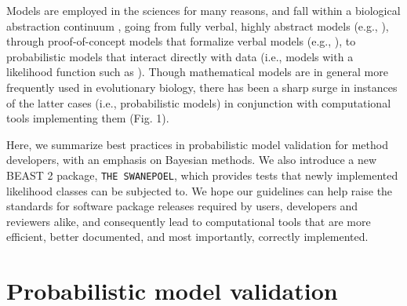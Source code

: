 \documentclass[oneside]{article}
\begin{document}
Models are employed in the sciences for many reasons, and fall within
a biological abstraction continuum \citep{servedio14}, going from
fully verbal, highly abstract models (e.g., \citealt{vanvalen73}), through proof-of-concept models
that formalize verbal models (e.g., \citealt{maynard78,reinhold99,mendes18}), to probabilistic models that interact
directly with data (i.e., models with a likelihood function such as \citealt{yule24,felsenstein73,hky,hudson90}).
Though mathematical models are in general more frequently used in
evolutionary biology, there has been a sharp surge in instances of the
latter cases (i.e., probabilistic models) in conjunction with computational tools implementing them
(Fig. 1).

\vspace{.5cm}


Here, we summarize best practices in probabilistic  model validation for method
developers, with an emphasis on Bayesian methods.
We also introduce a new BEAST 2 package, \texttt{THE SWANEPOEL}, which
provides tests that newly implemented likelihood classes can
be subjected to.
We hope our guidelines can help raise the standards for software
package releases required by users, developers and reviewers alike,
and consequently lead to computational tools that are more efficient, better documented, and most
importantly, correctly implemented.



\section*{Probabilistic model validation}
\end{document}
